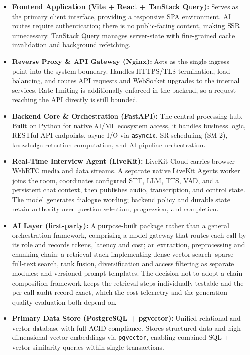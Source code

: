 \begin{itemize}
    \item \textbf{Frontend Application (Vite + React + TanStack Query):} Serves as the primary client interface, providing a responsive SPA environment. All routes require authentication; there is no public-facing content, making SSR unnecessary. TanStack Query manages server-state with fine-grained cache invalidation and background refetching.

    \item \textbf{Reverse Proxy \& API Gateway (Nginx):} Acts as the single ingress point into the system boundary. Handles HTTPS/TLS termination, load balancing, and routes API requests and WebSocket upgrades to the internal services. Rate limiting is additionally enforced in the backend, so a request reaching the API directly is still bounded.

    \item \textbf{Backend Core \& Orchestration (FastAPI):} The central processing hub. Built on Python for native AI/ML ecosystem access, it handles business logic, RESTful API endpoints, async I/O via \texttt{asyncio}, SR scheduling (SM-2), knowledge retention computation, and AI pipeline orchestration.

    \item \textbf{Real-Time Interview Agent (LiveKit):} LiveKit Cloud carries browser WebRTC media and data streams. A separate native LiveKit Agents worker joins the room, coordinates configured STT, LLM, TTS, VAD, and a persistent chat context, then publishes audio, transcription, and control state. The model generates dialogue wording; backend policy and durable state retain authority over question selection, progression, and completion.

    \item \textbf{AI Layer (first-party):} A purpose-built package rather than a general orchestration framework, comprising a model gateway that routes each call by its role and records tokens, latency and cost; an extraction, preprocessing and chunking chain; a retrieval stack implementing dense vector search, sparse full-text search, rank fusion, diversification and access filtering as separate modules; and versioned prompt templates. The decision not to adopt a chain-composition framework keeps the retrieval steps individually testable and the per-call audit record exact, which the cost telemetry and the generation-quality evaluation both depend on.

    \item \textbf{Primary Data Store (PostgreSQL + pgvector):} Unified relational and vector database with full ACID compliance. Stores structured data and high-dimensional vector embeddings via \texttt{pgvector}, enabling combined SQL + vector similarity queries within single transactions.


\end{itemize}
